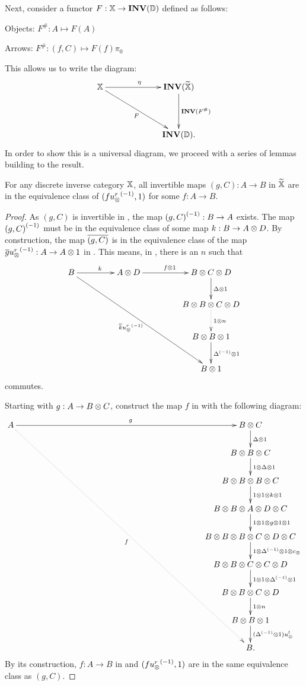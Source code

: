 Next, consider a functor $F:\mathbb{X} \to \mathbf{INV}({\mathbb{D}})$ defined as follows:
\begin{description}
  \item{Objects:} $F^{\#}:A \mapsto F(A)$
  \item{Arrows:} $F^{\#}:(f,C) \mapsto F(f)\pi_0$
\end{description}

This allows us to write the diagram:
\begin{equation}
  \xymatrix @C=65pt @R=40pt{
    \X \ar[r]^{\eta} \ar[rd]_{F}& \Inv{\Xt} \ar[d]^{\Inv{F^{\#}}}\\
    &\Inv{\D}.
  }
  \label{dia:universal_property_of_inverse_categories}
\end{equation}
In order to show this is a universal diagram, we proceed with a series of lemmas building to the
result.

\begin{lemma}\label{lem:all_invertible_maps_in_xt_are_of_the_form_f_inv_usr}
  For any discrete inverse category $\mathbb{X}$, all invertible maps $(g,C):A\to B$ in $\widetilde{\mathbb{X}}$ are in the
  equivalence class of $(f {u_{\otimes}^r}^{(-1)},1)$ for some $f:A\to B$.
\end{lemma}
\begin{proof}
  As $(g,C)$ is invertible in \Xt, the map ${(g,C)}^{(-1)}: B \to A$ exists. The map ${(g,C)}^{(-1)}$ must be in
  the equivalence class of some map $k:B \to A \otimes D$. By construction, the map  $\overline{(g,C)}$ is
  in the equivalence class of the map $\overline{g}{u_{\otimes}^r}^{(-1)}:A \to A\otimes1$ in \X. This means,
  in \X, there is an $n$ such that
  \[
    \xymatrix @C=45pt @R=25pt{
      B \ar[r]^{k} \ar[rrddd]_{\rst{k}\inv{\usr}}
        & A \*D \ar[r]^{f\*1}&B\*C\*D \ar[d]^{\Delta\*1}\\
      & &  B\*B\*C\*D \ar@{.>}[d]^{1\* n} \\
      & &  B\*B\*1 \ar[d]^{\inv{\Delta}\* 1}\\
      && B\* 1
    }
  \]
  commutes.

  Starting with $g:A\to B\otimes C$, construct the map $f$ in \X with the following diagram:
  \[
    \xymatrix @C=225pt @R=20pt{
      A \ar[r]^{g} \ar@{.>}[rdddddddd]_{f}& B \*C \ar[d]^{\Delta\*1}\\
      &B\*B\*C \ar[d]^{1\*\Delta\*1}\\
      &B\*B\*B\*C \ar[d]^{1\*1\*k\*1}\\
      &B\*B\*A\*D\*C \ar[d]^{1\*1\*g\*1\*1}\\
      &B\*B\*B\*C\*D\*C \ar[d]^{1\*\inv{\Delta}\*1\*c_{\*}}\\
      &B\*B\*C\*C\*D \ar[d]^{1\*1\*\inv{\Delta}\*1}\\
      &B\*B\*C\*D \ar[d]^{1\*n}\\
      &B\*B\*1 \ar[d]^{(\inv{\Delta}\* 1) \usl }\\
      &B.
    }
  \]
  By its construction, $f:A\to B$ in \X and $(f{u_{\otimes}^r}^{(-1)},1)$ are in the same equivalence class as
  $(g,C)$.

\end{proof}

